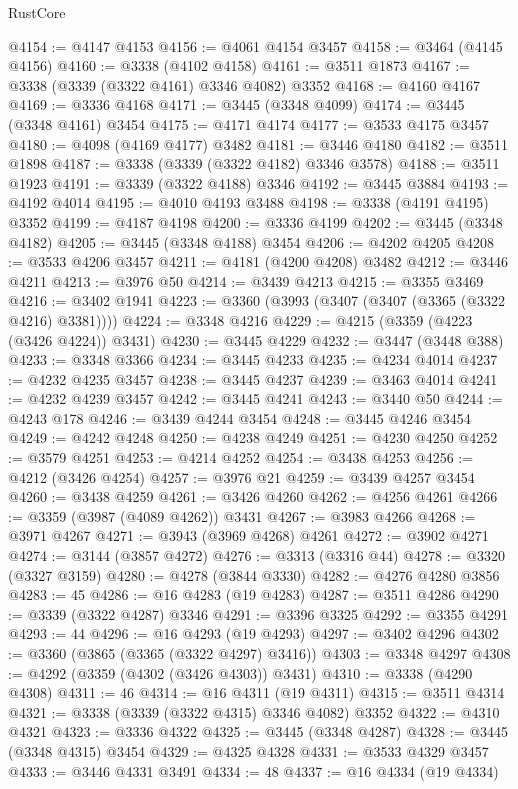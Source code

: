 \begin{lexlean}{RustCore}
\begin{coremodule}
@4154 := @4147 @4153
@4156 := @4061 @4154 @3457
@4158 := @3464 (@4145 @4156)
@4160 := @3338 (@4102 @4158)
@4161 := @3511 @1873
@4167 := @3338 (@3339 (@3322 @4161) @3346 @4082) @3352
@4168 := @4160 @4167
@4169 := @3336 @4168
@4171 := @3445 (@3348 @4099)
@4174 := @3445 (@3348 @4161) @3454
@4175 := @4171 @4174
@4177 := @3533 @4175 @3457
@4180 := @4098 (@4169 @4177) @3482
@4181 := @3446 @4180
@4182 := @3511 @1898
@4187 := @3338 (@3339 (@3322 @4182) @3346 @3578)
@4188 := @3511 @1923
@4191 := @3339 (@3322 @4188) @3346
@4192 := @3445 @3884
@4193 := @4192 @4014
@4195 := @4010 @4193 @3488
@4198 := @3338 (@4191 @4195) @3352
@4199 := @4187 @4198
@4200 := @3336 @4199
@4202 := @3445 (@3348 @4182)
@4205 := @3445 (@3348 @4188) @3454
@4206 := @4202 @4205
@4208 := @3533 @4206 @3457
@4211 := @4181 (@4200 @4208) @3482
@4212 := @3446 @4211
@4213 := @3976 @50
@4214 := @3439 @4213
@4215 := @3355 @3469
@4216 := @3402 @1941
@4223 := @3360 (@3993 (@3407 (@3407 (@3365 (@3322 @4216) @3381))))
@4224 := @3348 @4216
@4229 := @4215 (@3359 (@4223 (@3426 @4224)) @3431)
@4230 := @3445 @4229
@4232 := @3447 (@3448 @388)
@4233 := @3348 @3366
@4234 := @3445 @4233
@4235 := @4234 @4014
@4237 := @4232 @4235 @3457
@4238 := @3445 @4237
@4239 := @3463 @4014
@4241 := @4232 @4239 @3457
@4242 := @3445 @4241
@4243 := @3440 @50
@4244 := @4243 @178
@4246 := @3439 @4244 @3454
@4248 := @3445 @4246 @3454
@4249 := @4242 @4248
@4250 := @4238 @4249
@4251 := @4230 @4250
@4252 := @3579 @4251
@4253 := @4214 @4252
@4254 := @3438 @4253
@4256 := @4212 (@3426 @4254)
@4257 := @3976 @21
@4259 := @3439 @4257 @3454
@4260 := @3438 @4259
@4261 := @3426 @4260
@4262 := @4256 @4261
@4266 := @3359 (@3987 (@4089 @4262)) @3431
@4267 := @3983 @4266
@4268 := @3971 @4267
@4271 := @3943 (@3969 @4268) @4261
@4272 := @3902 @4271
@4274 := @3144 (@3857 @4272)
@4276 := @3313 (@3316 @44)
@4278 := @3320 (@3327 @3159)
@4280 := @4278 (@3844 @3330)
@4282 := @4276 @4280 @3856
@4283 := 45
@4286 := @16 @4283 (@19 @4283)
@4287 := @3511 @4286
@4290 := @3339 (@3322 @4287) @3346
@4291 := @3396 @3325
@4292 := @3355 @4291
@4293 := 44
@4296 := @16 @4293 (@19 @4293)
@4297 := @3402 @4296
@4302 := @3360 (@3865 (@3365 (@3322 @4297) @3416))
@4303 := @3348 @4297
@4308 := @4292 (@3359 (@4302 (@3426 @4303)) @3431)
@4310 := @3338 (@4290 @4308)
@4311 := 46
@4314 := @16 @4311 (@19 @4311)
@4315 := @3511 @4314
@4321 := @3338 (@3339 (@3322 @4315) @3346 @4082) @3352
@4322 := @4310 @4321
@4323 := @3336 @4322
@4325 := @3445 (@3348 @4287)
@4328 := @3445 (@3348 @4315) @3454
@4329 := @4325 @4328
@4331 := @3533 @4329 @3457
@4333 := @3446 @4331 @3491
@4334 := 48
@4337 := @16 @4334 (@19 @4334)

\end{coremodule}
\end{lexlean}
